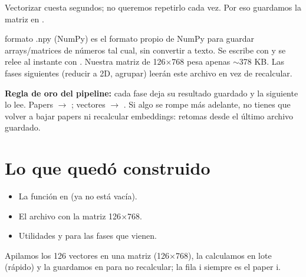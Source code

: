 \documentclass[11pt,a4paper]{article}
\begin{document}
Vectorizar cuesta segundos; no queremos repetirlo cada vez. Por eso guardamos la matriz en
.

\begin{concepto}{formato .npy (NumPy)}
 es el formato propio de NumPy para guardar arrays/matrices de números tal
cual, sin convertir a texto. Se escribe con  y se relee al instante con
. Nuestra matriz de 126$\times$768 pesa apenas $\sim$378 KB. Las fases
siguientes (reducir a 2D, agrupar) leerán este archivo en vez de recalcular.
\end{concepto}

\begin{ojo}
\textbf{Regla de oro del pipeline:} cada fase deja su resultado guardado y la siguiente lo
lee. Papers $\rightarrow$ ; vectores $\rightarrow$ .
Si algo se rompe más adelante, no tienes que volver a bajar papers ni recalcular embeddings:
retomas desde el último archivo guardado.
\end{ojo}

\section{Lo que quedó construido}

\begin{itemize}
  \item La función  en  (ya no está vacía).
  \item El archivo  con la matriz 126$\times$768.
  \item Utilidades  y  para las
        fases que vienen.
\end{itemize}

\begin{resumen}
Apilamos los 126 vectores en una matriz (126$\times$768), la calculamos en lote (rápido) y la
guardamos en  para no recalcular; la fila i siempre es el paper i.
\end{resumen}
\end{document}
